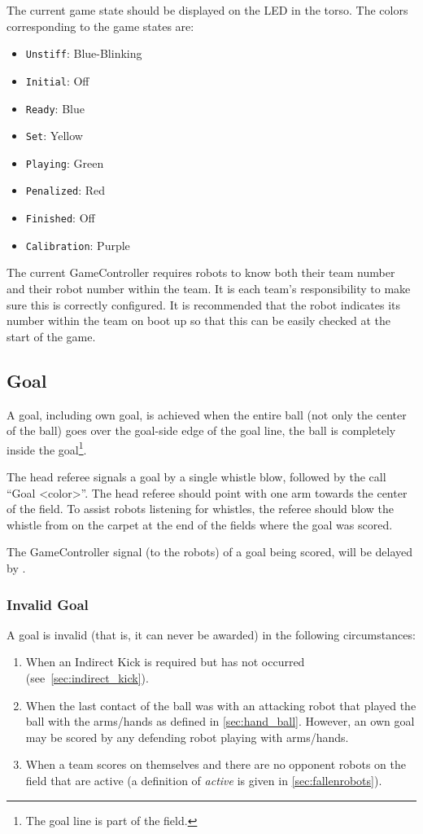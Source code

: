 The current game state should be displayed on the LED in the torso. The colors corresponding to the game states are:

\begin{itemize}
  \item \texttt{Unstiff}: Blue-Blinking
  \item \texttt{Initial}: Off
  \item \texttt{Ready}: Blue
  \item \texttt{Set}: Yellow
  \item \texttt{Playing}: Green
  \item \texttt{Penalized}: Red
  \item \texttt{Finished}: Off
  \item \texttt{Calibration}: Purple
\end{itemize}

The current GameController requires robots to know both their team number and their robot number within the team. It is each team's responsibility to make sure this is correctly configured. It is recommended that the robot indicates its number within the team on boot up so that this can be easily checked at the start of the game.

\subsection{Goal}
\label{sec:goal}
A goal, including own goal, is achieved when the entire ball (not only the center of the ball) goes over the goal-side edge of the goal line, \ie the ball is completely inside the goal\footnote{The goal line is part of the field.}.

The head referee signals a goal by a single whistle blow, followed by the call ``Goal \textless color\textgreater''.
The head referee should point with one arm towards the center of the field.
To assist robots listening for whistles, the referee should blow the whistle from on the carpet at the end of the fields where the goal was scored.

The GameController signal (to the robots) of a goal being scored, will be delayed by \GoalScoredDelay.

\subsubsection{Invalid Goal}
\label{sec:invalid_goal}

A goal is invalid (that is, it can never be awarded) in the following circumstances:
\begin{enumerate}
    \item When an Indirect Kick is required but has not occurred (see~\cref{sec:indirect_kick}).
    \item When the last contact of the ball was with an attacking robot that played the ball with the arms/hands as defined in \cref{sec:hand_ball}. However, an own goal may be scored by any defending robot playing with arms/hands.
    \item When a team scores on themselves and there are no opponent robots on the field that are active (a definition of \emph{active} is given in \cref{sec:fallenrobots}).
\end{enumerate}

